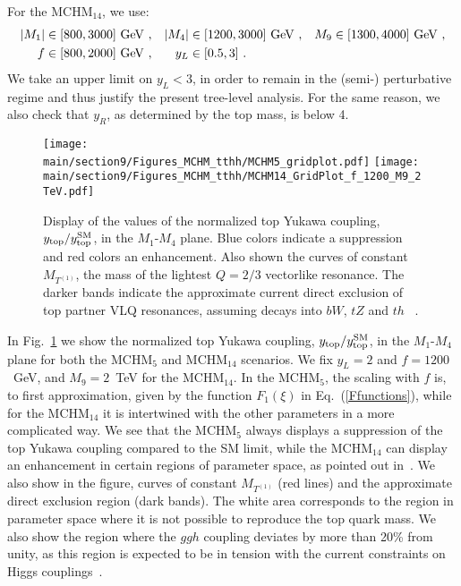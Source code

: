 For the MCHM$_{14}$, we use:
\begin{align*}
|M_1|& \in [800, 3000]~{\rm GeV}~, &  |M_4| &\in [1200, 3000]~{\rm GeV}~,  &  M_9 &\in [1300, 4000]~{\rm GeV}~,  \\
f&\in [800, 2000]~{\rm GeV}~,          &  y_L&\in [0.5, 3] ~.
\end{align*}
We take an upper limit on $y_L < 3$, in order to remain in the (semi-)
perturbative regime and thus justify the present tree-level analysis.
For the same reason, we also check that $y_R$, as determined by the
top mass, is below 4.
%
\begin{figure}[t]
\centering
\texttt{[image: \\main/section9/Figures\_MCHM\_tthh/MCHM5\_gridplot.pdf]}
\hspace{3mm}
\texttt{[image: \\main/section9/Figures\_MCHM\_tthh/MCHM14\_GridPlot\_f\_1200\_M9\_2TeV.pdf]}
\caption{Display of the values of the normalized top Yukawa coupling,
$y_{\rm top} / y_{\rm top}^{\rm SM}$, in the $M_1$-$M_4$ plane.  Blue
colors indicate a suppression and red colors an enhancement.  Also
shown the curves of constant $M_{T^{(1)}}$, the mass of the lightest $Q=2/3$
vectorlike resonance.  The darker bands indicate the approximate
current direct exclusion of top partner VLQ resonances, assuming decays into
$bW$, $tZ$ and $th$ ~\cite{Aaboud:2018pii, Sirunyan:2018omb}.}
\label{fig:ytvsM1M4}
\end{figure}
%
In Fig.~\ref{fig:ytvsM1M4} we show the normalized top Yukawa coupling,
$y_{\rm top} / y_{\rm top}^{\rm SM}$, in the $M_1$-$M_4$ plane for
both the MCHM$_5$ and MCHM$_{14}$ scenarios.  We fix $y_L = 2$ and $f
= 1200$~GeV, and $M_9 = 2$~TeV for the MCHM$_{14}$.  In the MCHM$_5$,
the scaling with $f$ is, to first approximation, given by the function
$F_1(\xi)$ in Eq.~(\ref{Ffunctions}), while for the MCHM$_{14}$ it is
intertwined with the other parameters in a more complicated way.  We
see that the MCHM$_5$ always displays a suppression of the top Yukawa
coupling compared to the SM limit, while the MCHM$_{14}$ can display
an enhancement in certain regions of parameter space, as pointed out
in~\cite{Liu:2017dsz}.  We also show in the figure, curves of constant
$M_{T^{(1)}}$ (red lines) and the approximate direct exclusion region
(dark bands).  The white area corresponds to the region in parameter
space where it is not possible to reproduce the top quark mass.  We
also show the region where the $ggh$ coupling deviates by more than
20\% from unity, as this region is expected to be in tension with the
current constraints on Higgs couplings~\cite{Khachatryan:2016vau}.

